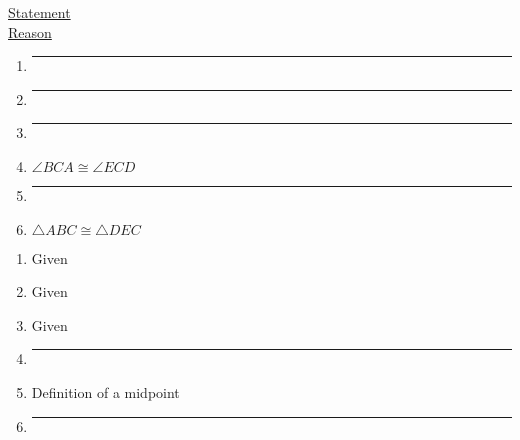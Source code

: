 \documentclass[12pt, twoside]{article}
\begin{document}
\begin{enumerate}
   \begin{multicols}{2}
     \underline{Statement} \\
     \underline{Reason}
   \end{multicols}
   \begin{multicols}{2}
     \raggedcolumns
     \begin{enumerate}[label={\arabic*)}]
       \item \rule{4cm}{0.15mm} \vspace{0.3cm}
       \item \rule{4cm}{0.15mm} \vspace{0.3cm}
       \item \rule{4cm}{0.15mm} \vspace{0.3cm}
       \item $\angle BCA \cong \angle ECD$  \vspace{0.3cm}
       \item \rule{4cm}{0.15mm} \vspace{0.3cm}
       \item $\triangle ABC \cong \triangle DEC$ \vspace{0.3cm}
     \end{enumerate}
     \begin{enumerate}[label={\arabic*)}]
       \item Given \vspace{0.3cm}
       \item Given \vspace{0.3cm}
       \item Given \vspace{0.3cm}
       \item \rule{4cm}{0.15mm} \vspace{0.3cm}
       \item Definition of a midpoint \vspace{0.3cm}
       \item \rule{4cm}{0.15mm} \vspace{0.3cm}
     \end{enumerate}
   \end{multicols} %


\end{enumerate}
\end{document}
